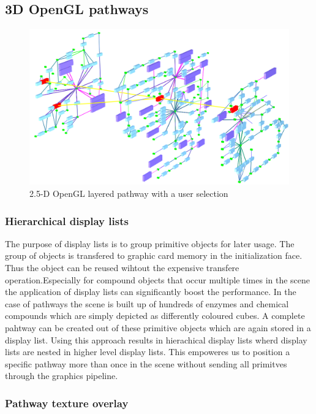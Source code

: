 \subsection{3D OpenGL pathways}

\begin{figure}
  \centering
    \includegraphics[width=0.7\linewidth]{gfx/opengl_layered_pathway_without_texture}
  \caption{2.5-D OpenGL layered pathway with a user selection}
  \label{fig:opengl_layered_pathway_without_texture}
\end{figure}

\subsubsection{Hierarchical display lists}

The purpose of display lists is to group primitive objects for later usage. The group of objects is transfered to graphic card memory in the initialization face. Thus the object can be reused wihtout the expensive transfere operation.Especially for compound objects that occur multiple times in the scene the application of display lists can significantly boost the performance. In the case of pathways the scene is built up of hundreds of enzymes and chemical compounds which are simply depicted as differently coloured cubes. A complete pahtway can be created out of these primitive objects which are again stored in a display list. Using this approach results in hierachical display lists wherd display lists are nested in higher level display lists. This empoweres us to position a specific pathway more than once in the scene without sending all primitves through the graphics pipeline. 
 
\subsubsection{Pathway texture overlay}


